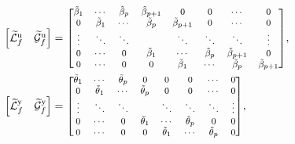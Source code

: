 {\begingroup\allowdisplaybreaks
\begin{align*}
    \begin{bmatrix}
        \widetilde{\mathcal{L}}^\mathrm{u}_f & \widetilde{\mathcal{G}}^\mathrm{u}_f 
    \end{bmatrix}&= {\scriptsize
    \begin{bmatrix}
        \tilde{\beta}_1     & \cdots      & \tilde{\beta}_{p}   & \tilde{\beta}_{p+1} & 0           & 0           & \cdots      & 0          \\
        0           & \tilde{\beta}_1     & \cdots      & \tilde{\beta}_{p}   & \tilde{\beta}_{p+1} & 0           & \cdots      & 0          \\
        \vdots      & \ddots      & \ddots      &             & \ddots      & \ddots      & \ddots      & \vdots     \\
        0           & \cdots      & 0           & \tilde{\beta}_1     & \cdots      & \tilde{\beta}_{p}   & \tilde{\beta}_{p+1} & 0          \\
        0           & \cdots      & 0           & 0           & \tilde{\beta}_1     & \cdots      & \tilde{\beta}_{p}   & \tilde{\beta}_{p+1}\\
    \end{bmatrix}
    },\\
    \begin{bmatrix}
        \widetilde{\mathcal{L}}^\mathrm{y}_f & \widetilde{\mathcal{G}}^\mathrm{y}_f 
    \end{bmatrix}&= {\scriptsize
    \begin{bmatrix}
        \tilde{\theta}_1    & \cdots      & \tilde{\theta}_{p}  & 0            & 0            & 0           & \cdots       & 0          \\
        0           & \tilde{\theta}_1    & \cdots      & \tilde{\theta}_{p}   & 0            & 0           & \cdots       & 0          \\
        \vdots      & \ddots      & \ddots      &              & \ddots       & \ddots      & \ddots       & \vdots     \\
        0           & \cdots      & 0           & \tilde{\theta}_1     & \cdots       & \tilde{\theta}_{p}  & 0            & 0          \\
        0           & \cdots      & 0           & 0            & \tilde{\theta}_1     & \cdots      & \tilde{\theta}_{p}   & 0          \\
    \end{bmatrix}},
\end{align*} \endgroup}%
